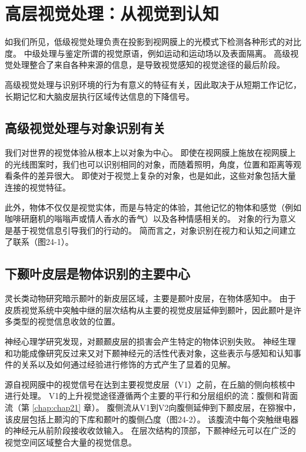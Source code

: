 \chapter{高层视觉处理：从视觉到认知} \label{chap:chap24}

如我们所见，低级视觉处理负责在投影到视网膜上的光模式下检测各种形式的对比度。
中级处理与鉴定所谓的视觉原语，例如运动和运动场以及表面隔离。
高级视觉处理整合了来自各种来源的信息，是导致视觉感知的视觉途径的最后阶段。


高级视觉处理与识别环境的行为有意义的特征有关，因此取决于从短期工作记忆，长期记忆和大脑皮层执行区域传达信息的下降信号。


\section{高级视觉处理与对象识别有关}

我们对世界的视觉体验从根本上以对象为中心。
即使在视网膜上施放在视网膜上的光线图案时，我们也可以识别相同的对象，而随着照明，角度，位置和距离等观看条件的差异很大。
即使对于视觉上复杂的对象，也是如此，这些对象包括大量连接的视觉特征。


此外，物体不仅仅是视觉实体，而是与特定的体验，其他记忆的物体和感觉（例如咖啡研磨机的嗡嗡声或情人香水的香气）以及各种情感相关的。
对象的行为意义是基于视觉信息引导我们的行动的。
简而言之，对象识别在视力和认知之间建立了联系（图24-1）。



\section{下颞叶皮层是物体识别的主要中心}

灵长类动物研究暗示颞叶的新皮层区域，主要是颞叶皮层，在物体感知中。
由于皮质视觉系统中突触中继的层次结构从主要的视觉皮层延伸到颞叶，因此颞叶是许多类型的视觉信息收敛的位置。


神经心理学研究发现，对颞颞皮层的损害会产生特定的物体识别失败。
神经生理和功能成像研究反过来又对下颞神经元的活性代表对象，这些表示与感知和认知事件的关系以及如何通过经验进行修饰的方式产生了显着的见解。


源自视网膜中的视觉信号在达到主要视觉皮层（V1）之前，在丘脑的侧向核核中进行处理。
V1的上升视觉途径遵循两个主要的平行和分层组织的流：腹侧和背面流（第 \ref{chap:chap21} 章）。 
腹侧流从V1到V2向腹侧延伸到下颞皮层，在猕猴中，该皮层包括上颞沟的下库和颞叶的腹侧凸度（图24-2）。 
该腹流中每个突触继电器的神经元从前阶段接收收敛输入。 
在层次结构的顶部，下颞神经元可以在广泛的视觉空间区域整合大量的视觉信息。



